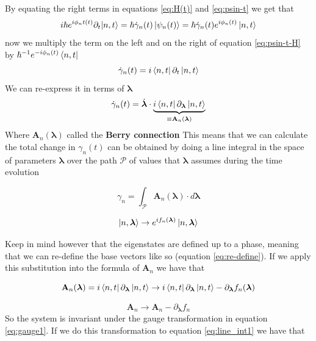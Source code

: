 \documentclass[11pt,a4paper]{report}
\theoremstyle{definition}
\theoremstyle{plain}
\theoremstyle{plain}
\begin{document}
		By equating the right terms in equations \ref{eq:H(t)} and \ref{eq:psin-t} we get that 
		\begin{equation}
			\label{eq:psin-t-H}
				i\hbar e^{i\phi_nt(t)}\partial_t|n,t\rangle=\hbar\dot \gamma_n(t)\ket{\psi_n(t)} =\hbar\dot \gamma_n(t)e^{i\phi_n(t)}\ket{n,t}
		\end{equation}    
		now we multiply the term on the left and on the right of equation \ref{eq:psin-t-H} by $\hbar^{-1}e^{-i\phi_n(t)} \bra{n,t}$
		\begin{equation}
			\label{eq:psin-t-H-bra}
				\dot \gamma_n(t)=i\bra{n,t} \partial_t\ket{n,t}
		\end{equation}
		We can re-express it in terms of $\boldsymbol \lambda$
		\begin{equation}
			\label{eq:psin-t-H-bra}
				\dot \gamma_n(t)=\dot{\boldsymbol \lambda}\cdot\underbrace{i\bra{n,t} \partial_{\boldsymbol \lambda}\ket{n,t}}_{\equiv \mathbf A_n(\boldsymbol \lambda)}
		\end{equation}
		Where $\mathbf A_n(\boldsymbol \lambda)$ called the \textbf{Berry connection}
		This means that we can calculate the total change in $\gamma_n(t)$ can be obtained by doing a line integral in the space of parameters $\boldsymbol \lambda$ over the path $\mathcal P$ of values that $\boldsymbol \lambda$ assumes during the time evolution

		\begin{equation}
			\label{eq:line_int1}
				\gamma_n=\int_\mathcal{P} \mathbf A_n(\boldsymbol \lambda) \cdot d\boldsymbol \lambda
		\end{equation}


		\begin{equation}
			\label{eq:re-define}
			\ket{n,\boldsymbol \lambda}\to e^{if_n(\boldsymbol \lambda)}\ket{n,\boldsymbol \lambda}
		\end{equation}

		Keep in mind however that the eigenstates are defined up to a phase, meaning that we can re-define the base vectors like so 
		(equation \ref{eq:re-define}). If we apply this substitution
		into the formula of $\mathbf A_n$ we have that

		\[
		\mathbf A_n(\boldsymbol \lambda) =i\bra{n,t} \partial_{\boldsymbol \lambda}\ket{n,t}\to i\bra{n,t} \partial_{\boldsymbol \lambda}\ket{n,t} - \partial_{\boldsymbol \lambda}f_n(\boldsymbol \lambda)
		\]

		\begin{equation}
			\label{eq:gauge1}
			\mathbf A_n \to \mathbf A_n - \partial_{\boldsymbol \lambda}f_n
		\end{equation}
			So the system is invariant under the gauge transformation in equation \ref{eq:gauge1}.  If we do this transformation to equation \ref{eq:line_int1} we have that
\end{document}
